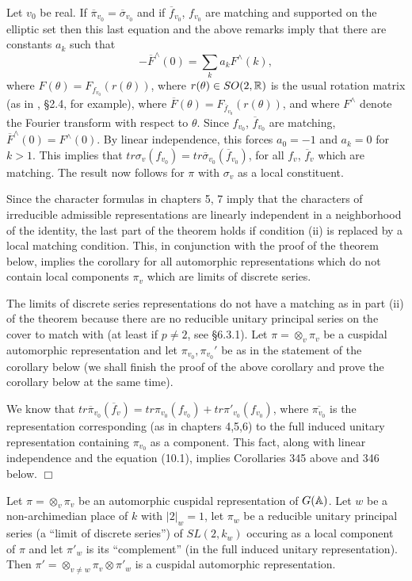 Let $v_0$ be real.
If $\overline{\pi}_{v_0}=\overline{\sigma}_{v_0}$ and
if $\overline{f}_{v_0}$, $f_{v_0}$ are matching and supported on the
elliptic set then this last equation and the above remarks imply
that there are constants $a_k$ such that
\[
-\overline{F}^{\wedge}(0)=\sum_k a_k F^{\wedge}(k),
\]
where $F(\theta)=F_{f_{v_0}}(r(\theta))$,
where $r(\theta)\in SO(2,{\Bbb{R}})$
is the usual rotation matrix (as in \cite{Fl}, \S 2.4, for
example), where
$\overline{F}(\theta)=F_{\overline{f}_{v_0}}(r(\theta))$, and where
$F^\wedge$ denote the Fourier transform with respect to $\theta$.
Since $f_{v_0}$, $\overline{f}_{v_0}$ are matching,
$\overline{F}^\wedge(0)=F^\wedge(0)$. By linear independence, this forces
$a_0=-1$ and $a_k=0$ for $k>1$. This implies that 
$tr \sigma_v(f_{v_0})=tr\overline{\sigma}_{v_0}(\overline{f}_{v_0})$,
for all $f_v$, $\overline{f}_v$ which are matching. The result now
follows for $\pi$ with $\sigma_v$ as a local constituent.

Since the character formulas in chapters 5, 7
imply that the characters of irreducible
admissible representations are linearly independent in a
neighborhood of the identity, the last part of the theorem holds
if condition (ii) is replaced by a local matching condition.
This, in conjunction with the proof of the theorem below,
implies the corollary for all automorphic representations
which do not contain local components $\pi_v$ which are
limits of discrete series. 

The limits of discrete series representations do not have a
matching as in part (ii) of the theorem because there
are no reducible unitary principal series on the cover to match
with (at least if $p\not= 2$, see \S 6.3.1).
Let $\pi=\otimes_v\pi_v$ be a cuspidal automorphic
representation and let $\pi_{v_0},\pi_{v_0}'$ be as in the statement
of the corollary below (we shall finish the proof of the above
corollary and prove the corollary below at the same time).

We know that $tr\overline{\pi}_{v_0}(\overline{f}_v)
=tr \pi_{v_0}(f_{v_0})+tr \pi'_{v_0}(f_{v_0})$,
where $\overline{\pi_{v_0}}$ is the representation
corresponding (as in chapters 4,5,6)
to the full induced unitary representation containing $\pi_{v_0}$
as a component.
This fact, along with linear independence and the equation
(10.1), implies Corollaries 345 above and 346 below. $\Box$

\begin{corollary} Let $\pi=\otimes_v \pi_v$ be an automorphic
cuspidal representation of $G({\Bbb{A}})$.
Let $w$ be a non-archimedian place of $k$ with
$|2|_w=1$, let $\pi_w$ be a reducible unitary principal
series (a ``limit of
discrete series'') of $SL(2,k_w)$ occuring as a local component
of $\pi$ and let $\pi'_w$ is its
``complement'' (in the full induced unitary representation).
Then $\pi'=\otimes_{v\not= w}\pi_v\otimes\pi'_w$
is a cuspidal automorphic representation.
\end{corollary}


